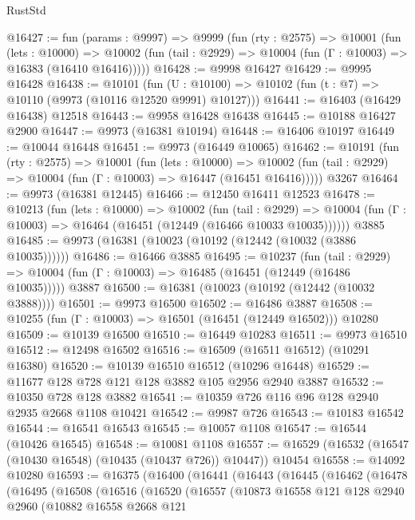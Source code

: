 \begin{lexlean}{RustStd}
\begin{coremodule}
@16427 := fun (params : @9997) =>
  @9999
    (fun (rty : @2575) =>
    @10001
      (fun (lets : @10000) =>
      @10002 (fun (tail : @2929) => @10004 (fun (Γ : @10003) => @16383 (@16410 @16416)))))
@16428 := @9998 @16427
@16429 := @9995 @16428
@16438 := @10101
    (fun (U : @10100) => @10102 (fun (t : @7) => @10110 (@9973 (@10116 @12520 @9991) @10127)))
@16441 := @16403 (@16429 @16438) @12518
@16443 := @9958 @16428 @16438
@16445 := @10188 @16427 @2900
@16447 := @9973 (@16381 @10194)
@16448 := @16406 @10197
@16449 := @10044 @16448
@16451 := @9973 (@16449 @10065)
@16462 := @10191
    (fun (rty : @2575) =>
    @10001
      (fun (lets : @10000) =>
      @10002 (fun (tail : @2929) => @10004 (fun (Γ : @10003) => @16447 (@16451 @16416)))))
    @3267
@16464 := @9973 (@16381 @12445)
@16466 := @12450 @16411 @12523
@16478 := @10213
    (fun (lets : @10000) =>
    @10002
      (fun (tail : @2929) =>
      @10004 (fun (Γ : @10003) => @16464 (@16451 (@12449 (@16466 @10033 @10035))))))
    @3885
@16485 := @9973 (@16381 (@10023 (@10192 (@12442 (@10032 (@3886 @10035))))))
@16486 := @16466 @3885
@16495 := @10237
    (fun (tail : @2929) => @10004 (fun (Γ : @10003) => @16485 (@16451 (@12449 (@16486 @10035)))))
    @3887
@16500 := @16381 (@10023 (@10192 (@12442 (@10032 @3888))))
@16501 := @9973 @16500
@16502 := @16486 @3887
@16508 := @10255 (fun (Γ : @10003) => @16501 (@16451 (@12449 @16502))) @10280
@16509 := @10139 @16500
@16510 := @16449 @10283
@16511 := @9973 @16510
@16512 := @12498 @16502
@16516 := @16509 (@16511 @16512) (@10291 @16380)
@16520 := @10139 @16510 @16512 (@10296 @16448)
@16529 := @11677 @128 @728 @121 @128 @3882 @105 @2956 @2940 @3887
@16532 := @10350 @728 @128 @3882
@16541 := @10359 @726 @116 @96 @128 @2940 @2935 @2668 @1108 @10421
@16542 := @9987 @726
@16543 := @10183 @16542
@16544 := @16541 @16543
@16545 := @10057 @1108
@16547 := @16544 (@10426 @16545)
@16548 := @10081 @1108
@16557 := @16529 (@16532 (@16547 (@10430 @16548) (@10435 (@10437 @726)) @10447)) @10454
@16558 := @14092 @10280
@16593 := @16375
    (@16400
      (@16441
        (@16443
          (@16445
            (@16462
              (@16478
                (@16495
                  (@16508
                    (@16516
                      (@16520
                        (@16557
                          (@10873
                            @16558
                            @121
                            @128
                            @2940
                            @2960
                            (@10882
                              @16558
                              @2668
                              @121

\end{coremodule}
\end{lexlean}
